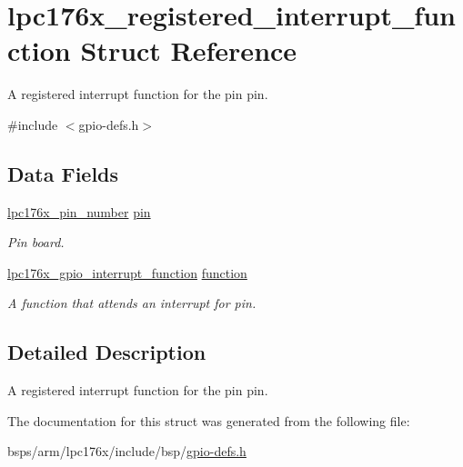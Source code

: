 \hypertarget{structlpc176x__registered__interrupt__function}{}\section{lpc176x\+\_\+registered\+\_\+interrupt\+\_\+function Struct Reference}
\label{structlpc176x__registered__interrupt__function}


A registered interrupt function for the pin \textquotesingle{}pin\textquotesingle{}.  




{\ttfamily \#include $<$gpio-\/defs.\+h$>$}

\subsection*{Data Fields}
\begin{DoxyCompactItemize}
\item 
\mbox{\label{structlpc176x__registered__interrupt__function_a5d13b253988a69a04f59dbdf71ec429a}} 
\mbox{\hyperlink{common-types_8h_a8215ced1557c43bc5925b691a3c1dc23}{lpc176x\+\_\+pin\+\_\+number}} \mbox{\hyperlink{structlpc176x__registered__interrupt__function_a5d13b253988a69a04f59dbdf71ec429a}{pin}}
\begin{DoxyCompactList}\small\item\em Pin board. \end{DoxyCompactList}\item 
\mbox{\label{structlpc176x__registered__interrupt__function_ac2feb231da90b37e285704f3f09d6836}} 
\mbox{\hyperlink{gpio-defs_8h_aee89c4be418a21db878253cdf558ecc5}{lpc176x\+\_\+gpio\+\_\+interrupt\+\_\+function}} \mbox{\hyperlink{structlpc176x__registered__interrupt__function_ac2feb231da90b37e285704f3f09d6836}{function}}
\begin{DoxyCompactList}\small\item\em A function that attends an interrupt for \textquotesingle{}pin\textquotesingle{}. \end{DoxyCompactList}\end{DoxyCompactItemize}


\subsection{Detailed Description}
A registered interrupt function for the pin \textquotesingle{}pin\textquotesingle{}. 

The documentation for this struct was generated from the following file\+:\begin{DoxyCompactItemize}
\item 
bsps/arm/lpc176x/include/bsp/\mbox{\hyperlink{gpio-defs_8h}{gpio-\/defs.\+h}}\end{DoxyCompactItemize}
